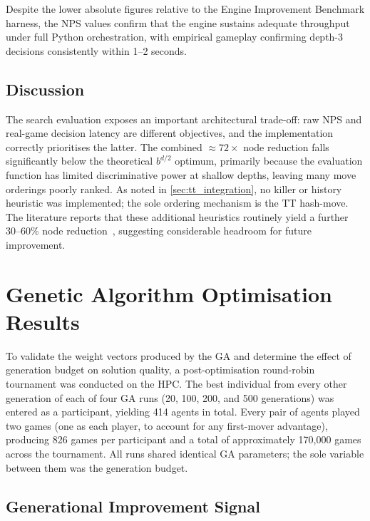 Despite the lower absolute figures relative to the Engine Improvement Benchmark harness, the NPS values
confirm that the engine sustains adequate throughput under full Python orchestration,
with empirical gameplay confirming depth-3 decisions consistently within 1--2 seconds.

\subsection{Discussion}

The search evaluation exposes an important architectural trade-off: raw NPS and real-game
decision latency are different objectives, and the implementation correctly prioritises the
latter. The combined ${\approx}72\times$ node reduction falls significantly below the
theoretical $b^{d/2}$ optimum, primarily because the evaluation function has limited
discriminative power at shallow depths, leaving many move orderings poorly ranked. As
noted in \cref{sec:tt_integration}, no killer or history heuristic was implemented; the sole ordering
mechanism is the TT hash-move. The literature reports that these additional heuristics
routinely yield a further 30--60\% node
reduction~\cite{Artificial_intelligence,brange2021evaluating}, suggesting considerable
headroom for future improvement.


\section{Genetic Algorithm Optimisation Results}
\label{sec:ga_results}

To validate the weight vectors produced by the GA and determine the effect of
generation budget on solution quality, a post-optimisation round-robin tournament
was conducted on the HPC. The best individual from every other generation of each
of four GA runs (20, 100, 200, and 500 generations) was entered as a
participant, yielding 414 agents in total. Every pair of agents played two games
(one as each player, to account for any first-mover advantage), producing 826
games per participant and a total of approximately 170{,}000 games across the
tournament. All runs shared identical GA parameters; the sole variable between
them was the generation budget.

\subsection{Generational Improvement Signal}
\label{sec:ga_improvement}

